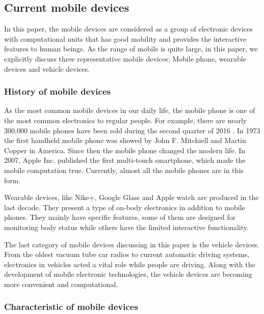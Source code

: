\documentclass[article]{aaltoseries}
\begin{document}


\subsection{Current mobile devices} %

In this paper, the mobile devices are considered as a group of electronic devices with
computational units that has good mobility and provides the interactive features to human beings.
As the range of mobile is quite large, in this paper, we explicitly discuss three representative 
mobile devices: Mobile phone, wearable devices and vehicle devices.




\subsubsection{History of mobile devices}

As the most common mobile devices in our daily life, the mobile phone is one of the most common 
electronics to regular people. For example, there are nearly 300,000 mobile phones have been 
sold during the second quarter of 2016 \cite{moblePhoneSale}. In 1973 the first handheld mobile phone
was showed by John F. Mitchiell and Martin Copper in America. Since then the mobile phone 
changed the modern life. In 2007, Apple Inc. published the first multi-touch smartphone,
 which made the mobile computation true.
  Currently, almost all the mobile phones are in this form. 


Wearable devices, like Nike+, Google Glass and Apple watch are produced in the last decade. They present
a type of on-body electronics in addition to mobile phones. They mainly have specific features, some of them
are designed for monitoring body status while others have the limited interactive functionality.

The last category of mobile devices discussing in this paper is the vehicle devices. From the oldest vacuum tube
car radios to current automatic driving systems, electronics in vehicles acted a vital role while people are
driving. Along with the development of mobile electronic technologies, the vehicle devices are becoming more convenient
and computational.



\subsubsection{Characteristic of mobile devices}
\label{sec:characteristic_mobile_devices}
\end{document}
